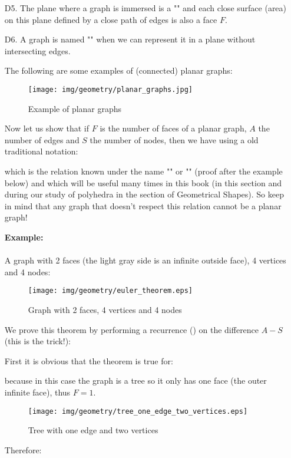 {\begin{enumerate}
	\item[D5.] The plane where a graph is immersed is a "" and each close surface (area) on this plane defined by a close path of edges is also a face $F$. 

	\item[D6.] A graph is named "" when we can represent it in a plane without intersecting edges.
	
	The following are some examples of (connected) planar graphs:
	\begin{figure}[H]
		\centering
		\texttt{[image: img/geometry/planar\_graphs.jpg]}
		\caption{Example of planar graphs}
	\end{figure}

\begin{theorem}
	Now let us show that if $F$ is the number of faces of a planar graph, $A$ the number of edges and $S$ the number of nodes, then we have using a old traditional notation:
	
which is the relation known under the name "" or "" (proof after the example below) and which will be useful many times in this book (in this section and during our study of polyhedra in the section of Geometrical Shapes). So keep in mind that any graph that doesn't respect this relation cannot be a planar graph!

	\begin{tcolorbox}[colframe=black,colback=white,sharp corners]
	\textbf{{\Large {}}Example:}\\\\
	A graph with 2 faces (the light gray side is an infinite outside face), 4 vertices and 4 nodes:
	\begin{figure}[H]
		\centering
		\texttt{[image: img/geometry/euler\_theorem.eps]}
		\caption{Graph with 2 faces, 4 vertices and 4 nodes}
	\end{figure}
	\end{tcolorbox}
\end{theorem}
\begin{dem}
We prove this theorem by performing a recurrence () on the difference $A - S$ (this is the trick!):

First it is obvious that the theorem is true for:
	
because in this case the graph is a tree so it only has one face (the outer infinite face), thus $F=1$.
\begin{figure}[H]
\centering
\texttt{[image: img/geometry/tree\_one\_edge\_two\_vertices.eps]}
\caption{Tree with one edge and two vertices}
\end{figure}
Therefore:
	

\end{dem}
\end{enumerate}}
